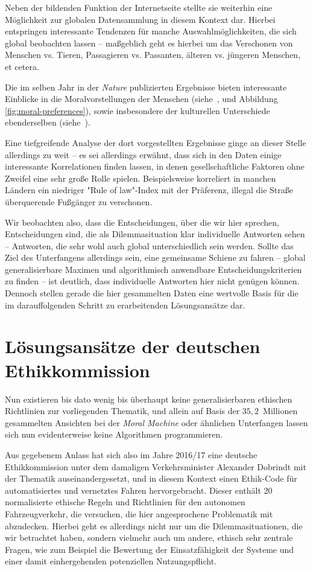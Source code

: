 \documentclass[twocolumn, german]{tum-article}
\begin{document}
Neben der bildenden Funktion der Internetseite stellte sie weiterhin eine Möglichkeit zur globalen Datensammlung in diesem Kontext dar.
Hierbei entspringen interessante Tendenzen für manche Auswahlmöglichkeiten, die sich global beobachten lassen -- maßgeblich geht es hierbei um das Verschonen von Menschen vs. Tieren, Passagieren vs. Passanten, älteren vs. jüngeren Menschen, et cetera.

Die im selben Jahr in der \emph{Nature} publizierten Ergebnisse bieten interessante Einblicke in die Moralvorstellungen der Menschen (siehe~\cite[S. 61]{moral-machine}, und Abbildung \vref{fig:moral-preferences}), sowie insbesondere der kulturellen Unterschiede ebenderselben (siehe~\cite[S. 62]{moral-machine}).

Eine tiefgreifende Analyse der dort vorgestellten Ergebnisse ginge an dieser Stelle allerdings zu weit -- es sei allerdings erwähnt, dass sich in den Daten einige interessante Korrelationen finden lassen, in denen gesellschaftliche Faktoren ohne Zweifel eine sehr große Rolle spielen.
Beispielsweise korreliert in manchen Ländern ein niedriger "Rule of law"-Index mit der Präferenz, illegal die Straße überquerende Fußgänger zu verschonen.

Wir beobachten also, dass die Entscheidungen, über die wir hier sprechen, Entscheidungen sind, die als Dilemmasituation klar individuelle Antworten sehen -- Antworten, die sehr wohl auch global unterschiedlich sein werden.
Sollte das Ziel des Unterfangens allerdings sein, eine gemeinsame Schiene zu fahren -- global generalisierbare Maximen und algorithmisch anwendbare Entscheidungskriterien zu finden -- ist deutlich, dass individuelle Antworten hier nicht genügen können. Dennoch stellen gerade die hier gesammelten Daten eine wertvolle Basis für die im darauffolgenden Schritt zu erarbeitenden Lösungsansätze dar.


\section{Lösungsansätze der deutschen Ethikkommission}
Nun existieren bis dato wenig bis überhaupt keine generalisierbaren ethischen Richtlinien zur vorliegenden Thematik, und allein auf Basis der $35,2$~Millionen gesammelten Ansichten bei der \emph{Moral Machine} oder ähnlichen Unterfangen lassen sich nun evidenterweise keine Algorithmen programmieren.

Aus gegebenem Anlass hat sich also im Jahre 2016/17 eine deutsche Ethikkommission unter dem damaligen Verkehrsminister Alexander Dobrindt mit der Thematik auseinandergesetzt, und in diesem Kontext einen Ethik-Code für automatisiertes und vernetztes Fahren hervorgebracht.
Dieser enthält 20 normalisierte ethische Regeln und Richtlinien für den autonomen Fahrzeugverkehr, die versuchen, die hier angesprochene Problematik mit abzudecken.
Hierbei geht es allerdings nicht nur um die Dilemmasituationen, die wir betrachtet haben, sondern vielmehr auch um andere, ethisch sehr zentrale Fragen, wie zum Beispiel die Bewertung der Einsatzfähigkeit der Systeme und einer damit einhergehenden potenziellen Nutzungspflicht.
\end{document}
